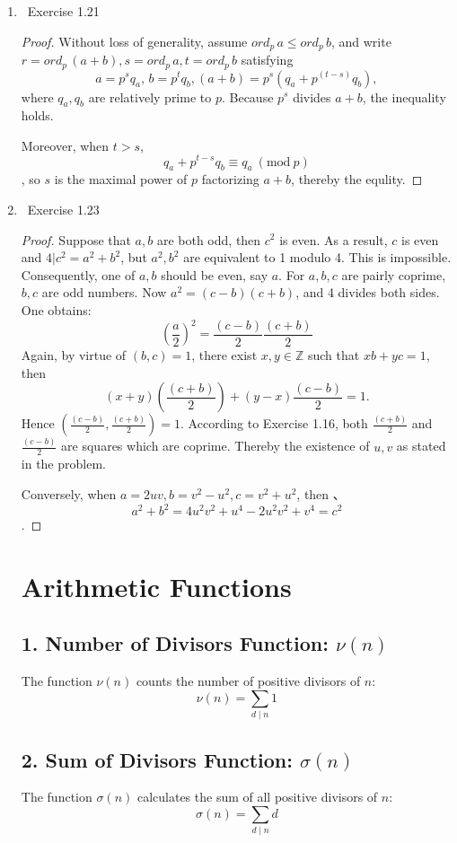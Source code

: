 \documentclass[11pt]{article}
\newcommand\0{\mathbf{0}}
\newcommand\ZZ{\mathbb{Z}}
\newcommand\<{\langle}
\renewcommand\>{\rangle}
\renewcommand\mod[1]{\ (\mathrm{mod}\ #1)}
\begin{document}
\begin{enumerate}
\begin{proof}
\end{proof}
\item\ Exercise 1.21
\begin{proof}
    Without loss of generality, assume $ord_p\,a \leq ord_p\,b$, and write $r = ord_p\,(a+b), s = ord_p\,a, t = ord_p\,b$ satisfying
    \[a = p^sq_a,\, b = p^tq_b, (a+b)= p^s(q_a + p^{(t-s)}q_b),\] where
    $q_a, q_b$ are relatively prime to $p$. Because $p^s$ divides $a+b$, 
    the inequality holds.\par
    Moreover, when $t > s$, \[q_a + p^{t-s}q_b \equiv q_a \mod{p}\], so $s$ is the maximal power of $p$ factorizing $a+b$,
    thereby the equlity.
\end{proof}
\item\ Exercise  1.23
\begin{proof}
    Suppose that $a,b$ are both odd, then $c^2$ is even.
    As a result, $c$ is even and $4|c^2 = a^2 + b^2$, but $a^2, b^2$ are equivalent to 1 modulo 4. This is impossible. Consequently, 
    one of $a,b$ should be even, say $a$. For $a,b,c$ are pairly coprime, $b,c$ are odd numbers. Now $a^2 = (c-b)(c+b)$, and 4 divides both sides. One obtains: 
    \[\left(\frac{a}{2}\right)^2 = \frac{(c-b)}{2}\frac{(c+b)}{2}\] Again, by virtue of $(b,c)=1$,
    there exist $x,y \in \ZZ$ such that $xb+yc=1$, then \[(x+y)(\frac{(c+b)}{2})+ (y-x)\frac{(c-b)}{2} = 1.\] Hence $(\frac{(c-b)}{2}, \frac{(c+b)}{2})=1$.
    According to Exercise 1.16, both $\frac{(c+b)}{2}$ and $\frac{(c-b)}{2}$ are squares which are coprime. Thereby the existence of $u,v$ as stated in the problem.\par
    Conversely, when $a = 2uv, b= v^2-u^2, c = v^2+u^2$, then 、\[a^2 + b^2 = 4u^2v^2 + u^4 - 2u^2v^2 +v^4 = c^2\].

\end{proof}
\newpage
\section{Arithmetic Functions}
\subsection*{1. Number of Divisors Function: \(\nu(n)\)}
The function \(\nu(n)\) counts the number of positive divisors of \(n\):
\[
\nu(n) = \sum_{d \mid n} 1
\]
\subsection*{2. Sum of Divisors Function: \(\sigma(n)\)}
The function \(\sigma(n)\) calculates the sum of all positive divisors of \(n\):
\[
\sigma(n) = \sum_{d \mid n} d
\]

\end{enumerate}
\end{document}
